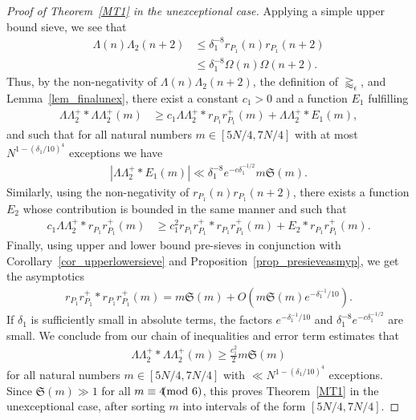 \documentclass[12pt]{amsart}
\theoremstyle{definition}
\theoremstyle{remark}
\numberwithin{equation}{section}
\newcommand{\1}{\mathbf{1}}
\let\oldpmod\pmod
\renewcommand{\pmod}[1]{\hspace{-0.12cm}\oldpmod {#1}}
\begin{document}
        \begin{proof}[Proof of Theorem~\ref{MT1} in the unexceptional case]
			Applying a simple upper bound sieve, we see that
			\begin{align*}
				\Lambda(n)\Lambda_2(n+2)&\leq \delta_1^{-8}r_{P_1}(n)r_{P_1}(n+2)\\
				&\leq \delta_1^{-8}\Omega(n)\Omega(n+2).
			\end{align*}
			Thus, by the non-negativity of $\Lambda(n)\Lambda_2(n+2)$, the definition of $\gtrapprox_{\epsilon}$, and Lemma~\ref{lem_finalunex}, there exist a constant $c_1>0$ and a function $E_1$ fulfilling
			\begin{align*}
				\Lambda \Lambda_2^+*\Lambda \Lambda_2^+(m)&\geq  c_1 \Lambda \Lambda_2^+* r_{P_1} r^+_{P_1}(m)+\Lambda \Lambda_2^+*E_1(m),
			\end{align*}
			and such that for all natural numbers $m\in [5N/4,7N/4]$ with at most $N^{1-(\delta_1/10)^{4}}$ exceptions we have
			\begin{align*}
				|\Lambda \Lambda_2^+*E_1(m)|\ll \delta_1^{-8} e^{-c\delta_1^{-1/2}}  m \mathfrak{S}(m).
			\end{align*}
			Similarly, using the non-negativity of $r_{P_1}(n)r_{P_1}(n+2)$, there exists a function $E_2$ whose contribution is bounded in the same manner and such that
			\begin{align*}
				c_1 \Lambda \Lambda_2^+* r_{P_1} r^+_{P_1}(m)&\geq c_1^2 r_{P_1} r^+_{P_1}* r_{P_1} r^+_{P_1}(m)+E_2* r_{P_1} r^+_{P_1}(m).
			\end{align*}
			  Finally, using upper and lower bound pre-sieves in conjunction with Corollary~\ref{cor_upperlowersieve} and Proposition~\ref{prop_presieveasmyp}, we get the asymptotics 
			\begin{align*}
				r_{P_1} r^+_{P_1}* r_{P_1} r^+_{P_1}(m)=m \mathfrak{S}(m)+O\left(m \mathfrak{S}(m) e^{-\delta_1^{-1}/10}\right).
			\end{align*}
			If $\delta_1$ is sufficiently small in absolute terms, the factors $e^{-\delta_1^{-1}/10}$ and $\delta_1^{-8} e^{-c\delta_1^{-1/2}}$ are small. We conclude from our chain of inequalities and error term estimates that
			\begin{align*}
				\Lambda \Lambda_2^+*\Lambda \Lambda_2^+(m)\geq \frac{c_1^2}{2} m \mathfrak{S}(m)
			\end{align*}
			for all natural numbers $m\in [5N/4,7N/4]$ with $\ll N^{1-(\delta_1/10)^{4}}$ exceptions. Since $\mathfrak{S}(m)\gg 1$ for all $m\equiv 4\pmod{6}$, this proves Theorem~\ref{MT1} in the unexceptional case, after sorting $m$ into intervals of the form $[5N/4,7N/4]$. 
		\end{proof}
		
\end{document}
